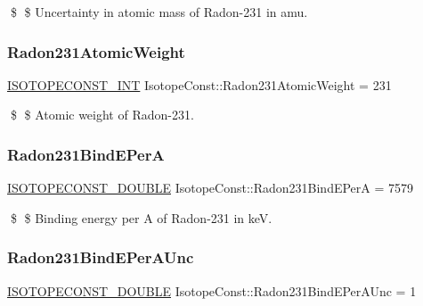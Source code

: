 \$ \$ Uncertainty in atomic mass of Radon-\/231 in amu. \mbox{\label{group___isotope_const-_radon-_rn231_ga071a584feed814a37dd27a29166376f4}} 
\subsubsection{\texorpdfstring{Radon231\+Atomic\+Weight}{Radon231AtomicWeight}}
{\footnotesize\ttfamily \mbox{\hyperlink{group___isotope_const-_macros_ga5f18360b3e99483a35c32d789e62621c}{I\+S\+O\+T\+O\+P\+E\+C\+O\+N\+S\+T\+\_\+\+I\+NT}} Isotope\+Const\+::\+Radon231\+Atomic\+Weight = 231}

\$ \$ Atomic weight of Radon-\/231. \mbox{\label{group___isotope_const-_radon-_rn231_ga7970bb7fe64b12348b6f9ef25325f421}} 
\subsubsection{\texorpdfstring{Radon231\+Bind\+E\+PerA}{Radon231BindEPerA}}
{\footnotesize\ttfamily \mbox{\hyperlink{group___isotope_const-_macros_ga8f45a7272ce02c0b4c65c44636ed719a}{I\+S\+O\+T\+O\+P\+E\+C\+O\+N\+S\+T\+\_\+\+D\+O\+U\+B\+LE}} Isotope\+Const\+::\+Radon231\+Bind\+E\+PerA = 7579}

\$ \$ Binding energy per A of Radon-\/231 in keV. \mbox{\label{group___isotope_const-_radon-_rn231_ga76253ed8bee6fdf513d69c74f16f4caa}} 
\subsubsection{\texorpdfstring{Radon231\+Bind\+E\+Per\+A\+Unc}{Radon231BindEPerAUnc}}
{\footnotesize\ttfamily \mbox{\hyperlink{group___isotope_const-_macros_ga8f45a7272ce02c0b4c65c44636ed719a}{I\+S\+O\+T\+O\+P\+E\+C\+O\+N\+S\+T\+\_\+\+D\+O\+U\+B\+LE}} Isotope\+Const\+::\+Radon231\+Bind\+E\+Per\+A\+Unc = 1}

